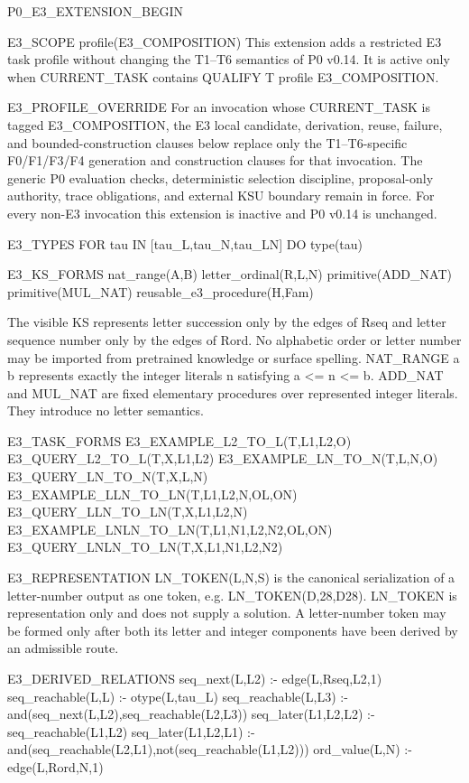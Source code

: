 P0_E3_EXTENSION_BEGIN

E3_SCOPE
profile(E3_COMPOSITION)
This extension adds a restricted E3 task profile without changing the T1--T6
semantics of P0 v0.14.  It is active only when CURRENT_TASK contains
QUALIFY T profile E3_COMPOSITION.

E3_PROFILE_OVERRIDE
For an invocation whose CURRENT_TASK is tagged E3_COMPOSITION, the E3 local
candidate, derivation, reuse, failure, and bounded-construction clauses below
replace only the T1--T6-specific F0/F1/F3/F4 generation and construction
clauses for that invocation.  The generic P0 evaluation checks, deterministic
selection discipline, proposal-only authority, trace obligations, and external
KSU boundary remain in force.  For every non-E3 invocation this extension is
inactive and P0 v0.14 is unchanged.

E3_TYPES
FOR tau IN [tau_L,tau_N,tau_LN] DO type(tau)

E3_KS_FORMS
nat_range(A,B)
letter_ordinal(R,L,N)
primitive(ADD_NAT)
primitive(MUL_NAT)
reusable_e3_procedure(H,Fam)

The visible KS represents letter succession only by the edges of Rseq and
letter sequence number only by the edges of Rord.  No alphabetic order or
letter number may be imported from pretrained knowledge or surface spelling.
NAT_RANGE a b represents exactly the integer literals n satisfying a <= n <= b.
ADD_NAT and MUL_NAT are fixed elementary procedures over represented integer
literals.  They introduce no letter semantics.

E3_TASK_FORMS
E3_EXAMPLE_L2_TO_L(T,L1,L2,O)
E3_QUERY_L2_TO_L(T,X,L1,L2)
E3_EXAMPLE_LN_TO_N(T,L,N,O)
E3_QUERY_LN_TO_N(T,X,L,N)
E3_EXAMPLE_LLN_TO_LN(T,L1,L2,N,OL,ON)
E3_QUERY_LLN_TO_LN(T,X,L1,L2,N)
E3_EXAMPLE_LNLN_TO_LN(T,L1,N1,L2,N2,OL,ON)
E3_QUERY_LNLN_TO_LN(T,X,L1,N1,L2,N2)

E3_REPRESENTATION
LN_TOKEN(L,N,S) is the canonical serialization of a letter-number output as
one token, e.g. LN_TOKEN(D,28,D28).  LN_TOKEN is representation only and does
not supply a solution.  A letter-number token may be formed only after both
its letter and integer components have been derived by an admissible route.

E3_DERIVED_RELATIONS
seq_next(L,L2) :- edge(L,Rseq,L2,1)
seq_reachable(L,L) :- otype(L,tau_L)
seq_reachable(L,L3) :- and(seq_next(L,L2),seq_reachable(L2,L3))
seq_later(L1,L2,L2) :- seq_reachable(L1,L2)
seq_later(L1,L2,L1) :- and(seq_reachable(L2,L1),not(seq_reachable(L1,L2)))
ord_value(L,N) :- edge(L,Rord,N,1)


